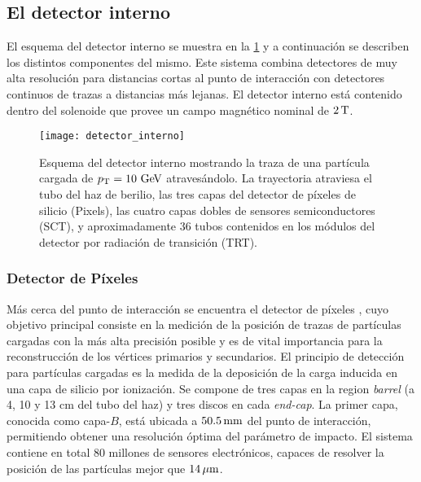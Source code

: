 \subsection{El detector interno}

El esquema del detector interno se muestra en la \cref{fig:detector_interno} y a
continuación se describen los distintos componentes del mismo. Este sistema
combina detectores de muy alta resolución para distancias cortas al punto de
interacción con detectores continuos de trazas a distancias más lejanas. El
detector interno está contenido dentro del solenoide que provee un campo
magnético nominal de $\unit[2]{T}$.

\begin{figure}[!tb]
  \centering

  \texttt{[image: detector\_interno]}
  \caption{Esquema del detector interno mostrando la traza de una partícula
    cargada de $\pt = 10\gev$ atravesándolo. La trayectoria atraviesa el
    tubo del haz de berilio, las tres capas del detector de píxeles de silicio (Pixels),
    las cuatro capas dobles de sensores semiconductores (SCT), y
    aproximadamente 36 tubos contenidos en los módulos del detector por radiación
  de transición (TRT).}\label{fig:detector_interno}

\end{figure}

\subsubsection{Detector de Píxeles}

Más cerca del punto de interacción se encuentra el detector de píxeles
\cite{Wermes:381263}, cuyo objetivo principal consiste en la medición de la
posición de trazas de partículas cargadas con la más alta precisión posible y es
de vital importancia para la reconstrucción de los vértices primarios y
secundarios. El principio de detección para partículas cargadas es la medida de
la deposición de la carga inducida en una capa de silicio por ionización.
Se compone de tres capas en la region \emph{barrel} (a 4, 10 y 13 cm del tubo
del haz) y tres discos en cada \emph{end-cap}.
La primer capa, conocida como capa-$B$, está ubicada a $\unit[50.5]{mm}$ del
punto de interacción, permitiendo obtener una resolución óptima del parámetro de impacto.
El sistema contiene en total 80 millones de sensores electrónicos, capaces de
resolver la posición de las partículas mejor que $\unit[14]{\mu m}$.


